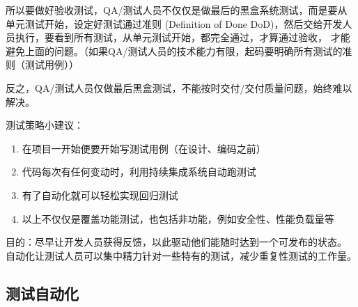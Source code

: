 所以要做好验收测试，QA/测试人员不仅仅是做最后的黑盒系统测试，而是要从单元测试开始，设定好测试通过准则
(Definition of Done
DoD)，然后交给开发人员执行，要看到所有测试，从单元测试开始，都完全通过，才算通过验收，
才能避免上面的问题。（如果QA/测试人员的技术能力有限，起码要明确所有测试的准则（测试用例））

反之，QA/测试人员仅做最后黑盒测试，不能按时交付/交付质量问题，始终难以解决。

测试策略小建议：

\begin{enumerate}
\tightlist
\item
  在项目一开始便要开始写测试用例（在设计、编码之前）
\item
  代码每次有任何变动时，利用持续集成系统自动跑测试
\item
  有了自动化就可以轻松实现回归测试
\item
  以上不仅仅是覆盖功能测试，也包括非功能，例如安全性、性能负载量等
\end{enumerate}

目的：尽早让开发人员获得反馈，以此驱动他们能随时达到一个可发布的状态。\\
自动化让测试人员可以集中精力针对一些特有的测试，减少重复性测试的工作量。

\hypertarget{ux6d4bux8bd5ux81eaux52a8ux5316}{%
\subsection{测试自动化}\label{ux6d4bux8bd5ux81eaux52a8ux5316}}


